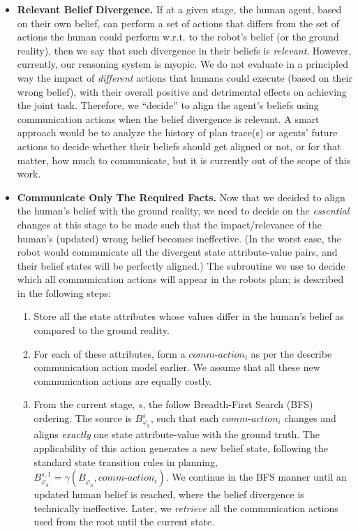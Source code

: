 \documentclass[letterpaper]{article} %
\begin{document}
\begin{itemize}
    \item \textbf{Relevant Belief Divergence.} 
    If at a given stage, the human agent, based on their own belief, can perform a set of actions that differs from the set of actions the human could perform w.r.t. to the robot's belief (or the ground reality), then we say that such divergence in their beliefs is \textit{relevant}.
    However, currently, our reasoning system is myopic. We do not evaluate in a principled way the impact of \textit{different} actions that humans could execute (based on their wrong belief), with their overall positive and detrimental effects on achieving the joint task. Therefore, we ``decide'' to align the agent's beliefs using communication actions when the belief divergence is relevant.
    A smart approach would be to analyze the history of plan trace(s) or agents' future actions to decide whether their beliefs should get aligned or not, or for that matter, how much to communicate, but it is currently out of the scope of this work. 
    
    \item \textbf{Communicate Only The Required Facts.}
    Now that we decided to align the human's belief with the ground reality, we need to decide on the \textit{essential} changes at this stage to be made such that the impact/relevance of the human's (updated) wrong belief becomes ineffective. (In the worst case, the robot would communicate all the divergent state attribute-value pairs, and their belief states will be perfectly aligned.) 
    The subroutine we use to decide which all communication actions will appear in the robots plan; is described in the following steps:
    \begin{enumerate}
        \item Store all the state attributes whose values differ in the human's belief as compared to the ground reality. 
        \item For each of these attributes, form a $\textit{comm-action}_i$ as per the describe communication action model earlier. We assume that all these new communication actions are equally costly. 
        \item From the current stage, $s$, the follow Breadth-First Search (BFS) ordering. 
        The source is $B_{\varphi_h}^s$, such that each $\textit{comm-action}_i$ changes and aligns \textit{exactly} one state attribute-value with the ground truth. The applicability of this action generates a new belief state, following the standard state transition rules in planning, 
        $B_{\varphi_h}^{s,1} = \gamma(B_{\varphi_h}, \textit{comm-action}_i)$. 
        We continue in the BFS manner until an updated human belief is reached, where the belief divergence is technically ineffective. 
        Later, we \textit{retrieve} all the communication actions used from the root until the current state.   
    \end{enumerate}
    

\end{itemize}
\end{document}
